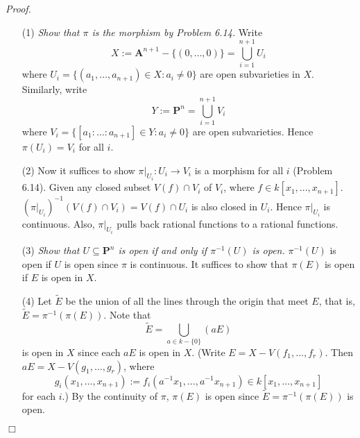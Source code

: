 \documentclass{article}
\begin{document}
\emph{Proof.}
\begin{enumerate}
\item[(1)]
  \emph{Show that $\pi$ is the morphism by Problem 6.14.}
  Write 
  \[
    X := \mathbf{A}^{n+1} - \{(0,\ldots,0)\} = \bigcup_{i=1}^{n+1} U_i
  \]
  where $U_i = \{ (a_1,\ldots,a_{n+1}) \in X : a_i \neq 0 \}$
  are open subvarieties in $X$.
  Similarly, write 
  \[
    Y := \mathbf{P}^{n} = \bigcup_{i=1}^{n+1} V_i
  \]
  where $V_i = \{ [a_1:\ldots:a_{n+1}] \in Y : a_i \neq 0 \}$
  are open subvarieties.
  Hence $\pi(U_i) = V_i$ for all $i$.

\item[(2)]
  Now it suffices to show $\pi|_{U_i}: U_i \to V_i$ is a morphism for all $i$ (Problem 6.14).
  Given any closed subset $V(f) \cap V_i$ of $V_i$, where $f \in k[x_1,\ldots,x_{n+1}]$.
  $(\pi|_{U_i})^{-1}(V(f) \cap V_i) = V(f) \cap U_i$ is also closed in $U_i$.
  Hence $\pi|_{U_i}$ is continuous.
  Also, $\pi|_{U_i}$ pulls back rational functions to a rational functions.

\item[(3)]
  \emph{Show that $U \subseteq \mathbf{P}^n$ is open if and only if $\pi^{-1}(U)$ is open.}
  $\pi^{-1}(U)$ is open if $U$ is open since $\pi$ is continuous.
  It suffices to show that $\pi(E)$ is open if $E$ is open in $X$.

\item[(4)]
  Let $\widetilde{E}$ be the union of all the lines through the origin that meet $E$,
  that is, $\widetilde{E} = \pi^{-1}(\pi(E))$.
  Note that
  \[
    \widetilde{E} = \bigcup_{a \in k-\{0\}} (aE)
  \]
  is open in $X$ since each $aE$ is open in $X$.
  (Write $E = X - V(f_1, \ldots, f_r)$.
  Then $aE = X - V(g_1, \ldots, g_r)$,
  where
  \[
    g_i(x_1,\ldots,x_{n+1})
    := f_i(a^{-1} x_1, \ldots, a^{-1}x_{n+1})
    \in k[x_1,\ldots,x_{n+1}]
  \]
  for each $i$.)
  By the continuity of $\pi$,
  $\pi(E)$ is open since $\widetilde{E} = \pi^{-1}(\pi(E))$ is open.
\end{enumerate}
$\Box$ \\\\







\end{document}
